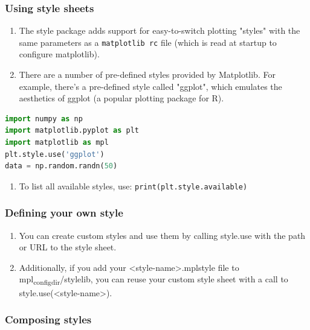 \documentclass[UTF8,a4paper,12pt]{ctexart}  %
\providecommand{\tightlist}{\setlength{\itemsep}{0pt}\setlength{\parskip}{0pt}}
\newcommand{\passthrough}[1]{\lstset{mathescape=false}#1\lstset{mathescape=true}}
\begin{document}
\hypertarget{using-style-sheets}{%
\subsubsection{Using style sheets}\label{using-style-sheets}}

\begin{enumerate}
\def\labelenumi{\arabic{enumi}.}
\tightlist
\item
  The style package adds support for easy-to-switch plotting
  "styles" with the same parameters as a \passthrough{\lstinline!matplotlib rc!} file (which
  is read at startup to configure matplotlib).
\item
  There are a number of pre-defined styles provided by Matplotlib. For
  example, there's a pre-defined style called "ggplot", which
  emulates the aesthetics of ggplot (a popular plotting package for
  R).
\end{enumerate}

\begin{lstlisting}[language=Python]
import numpy as np
import matplotlib.pyplot as plt
import matplotlib as mpl
plt.style.use('ggplot')
data = np.random.randn(50)
\end{lstlisting}

\begin{enumerate}
\def\labelenumi{\arabic{enumi}.}
\tightlist
\item
  To list all available styles, use: \passthrough{\lstinline!print(plt.style.available)!}
\end{enumerate}

\hypertarget{defining-your-own-style}{%
\subsubsection{Defining your own style}\label{defining-your-own-style}}

\begin{enumerate}
\def\labelenumi{\arabic{enumi}.}
\tightlist
\item
  You can create custom styles and use them by calling style.use with
  the path or URL to the style sheet.
\item
  Additionally, if you add your \textless{}style-name\textgreater{}.mplstyle file to
  mpl\textsubscript{configdir}/stylelib, you can reuse your custom style sheet with
  a call to style.use(\textless{}style-name\textgreater{}).
\end{enumerate}

\hypertarget{composing-styles}{%
\subsubsection{Composing styles}\label{composing-styles}}
\end{document}
